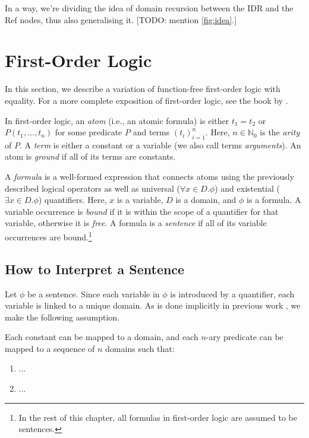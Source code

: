 In a way, we're dividing the idea of domain recursion between the IDR and the Ref nodes, thus also generalising it. [TODO: mention \cref{fig:idea}.]

\section{First-Order Logic}

In this section, we describe a variation of function-free first-order logic with equality. For a more complete exposition of first-order logic, see the book by \citet{DBLP:books/daglib/0023546}.

In first-order logic, an \emph{atom} (i.e., an atomic formula) is either $t_1 = t_2$ or $P(t_1, \dots, t_n)$ for some predicate $P$ and terms $(t_i)_{i=1}^n$. Here, $n \in \mathbb{N}_0$ is the \emph{arity} of $P$. A \emph{term} is either a constant or a variable (we also call terms \emph{arguments}). An atom is \emph{ground} if all of its terms are constants.

A \emph{formula} is a well-formed expression that connects atoms using the previously described logical operators as well as universal ($\forall x \in D. \phi$) and existential ($\exists x \in D. \phi$) quantifiers. Here, $x$ is a variable, $D$ is a domain, and $\phi$ is a formula. A variable occurrence is \emph{bound} if it is within the scope of a quantifier for that variable, otherwise it is \emph{free}. A formula is a \emph{sentence} if all of its variable occurrences are bound.\footnote{In the rest of this chapter, all formulas in first-order logic are assumed to be sentences.}

\subsection{How to Interpret a Sentence}

Let $\phi$ be a sentence. Since each variable in $\phi$ is introduced by a quantifier, each variable is linked to a unique domain. As is done implicitly in previous work \citep{DBLP:phd/basesearch/VandenBroeck13}, we make the following assumption.

\begin{assumption}
  Each constant can be mapped to a domain, and each $n$-ary predicate can be mapped to a sequence of $n$ domains such that:
  \begin{enumerate}
  \item ...
  \item ...
  \end{enumerate}
\end{assumption}


